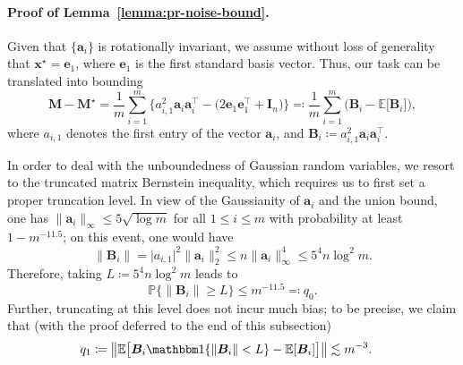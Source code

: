 \paragraph{Proof of Lemma~\ref{lemma:pr-noise-bound}.}
Given that $\{\bm{a}_{i}\}$ is rotationally invariant,  we  assume without
loss of generality that $\bm{x}^{\star}=\bm{e}_{1}$, where
$\bm{e}_{1}$ is the first standard basis vector. Thus, our task can be translated into bounding
%
\[
	\bm{M}-\bm{M}^{\star} =  \frac{1}{m}\sum_{i=1}^{m} \Big\{ a_{i,1}^{2}\bm{a}_{i}\bm{a}_{i}^{\top}-\big(2\bm{e}_{1}\bm{e}_{1}^{\top}+\bm{I}_{n}\big) \Big\}
	\eqqcolon \frac{1}{m}\sum_{i=1}^{m} \Big( \bm{B}_i - \mathbb{E}\big[\bm{B}_i \big] \Big),
\]
%
where $a_{i,1}$ denotes the first entry of the vector $\bm{a}_i$, and $\bm{B}_i\coloneqq a_{i,1}^{2}\bm{a}_{i}\bm{a}_{i}^{\top}$.



In order to deal with the unboundedness of Gaussian random variables,
we resort to the truncated matrix Bernstein inequality, which requires
us to first set a proper truncation level. In view of the Gaussianity
of $\bm{a}_{i}$ and the union bound, one has $\|\bm{a}_{i}\|_{\infty}\leq 5\sqrt{\log m}$ for all $1\leq i\leq m$
with probability at least $1-m^{-11.5}$; on this event, one would have
%
\begin{equation}
\label{eq:Bi-norm-early}
\big\|\bm{B}_{i}\big\|=\big|a_{i,1}\big|^{2}\big\|\bm{a}_{i}\big\|_{2}^{2}\leq n\big\|\bm{a}_{i}\big\|_{\infty}^{4}\leq5^4 n\log^{2}m .
\end{equation}
%
Therefore, taking
$L\coloneqq 5^4 n\log^{2}m$ leads to
\[
\mathbb{P}\big\{\big\|\bm{B}_{i}\big\|\geq L\big\}\leq m^{-11.5}\eqqcolon q_{0}.
\]
Further, truncating at this level does not incur much bias; to be precise, we claim that (with the proof deferred to the end of this subsection)
%
\begin{align}
	q_{1} & \coloneqq\big\|\mathbb{E}\big[\bm{B}_{i}\mathbbm1\{\|\bm{B}_{i}\|<L\}-\mathbb{E}[\bm{B}_{i}]\big]\big\| \lesssim m^{-3}.
	\label{eq:q1-bound-UB-PR}
\end{align}




